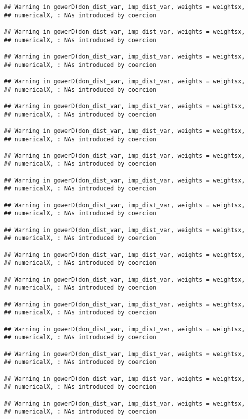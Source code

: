\documentclass[]{article}
\begin{document}
\begin{verbatim}
## Warning in gowerD(don_dist_var, imp_dist_var, weights = weightsx,
## numericalX, : NAs introduced by coercion

## Warning in gowerD(don_dist_var, imp_dist_var, weights = weightsx,
## numericalX, : NAs introduced by coercion

## Warning in gowerD(don_dist_var, imp_dist_var, weights = weightsx,
## numericalX, : NAs introduced by coercion

## Warning in gowerD(don_dist_var, imp_dist_var, weights = weightsx,
## numericalX, : NAs introduced by coercion

## Warning in gowerD(don_dist_var, imp_dist_var, weights = weightsx,
## numericalX, : NAs introduced by coercion

## Warning in gowerD(don_dist_var, imp_dist_var, weights = weightsx,
## numericalX, : NAs introduced by coercion

## Warning in gowerD(don_dist_var, imp_dist_var, weights = weightsx,
## numericalX, : NAs introduced by coercion

## Warning in gowerD(don_dist_var, imp_dist_var, weights = weightsx,
## numericalX, : NAs introduced by coercion

## Warning in gowerD(don_dist_var, imp_dist_var, weights = weightsx,
## numericalX, : NAs introduced by coercion

## Warning in gowerD(don_dist_var, imp_dist_var, weights = weightsx,
## numericalX, : NAs introduced by coercion

## Warning in gowerD(don_dist_var, imp_dist_var, weights = weightsx,
## numericalX, : NAs introduced by coercion

## Warning in gowerD(don_dist_var, imp_dist_var, weights = weightsx,
## numericalX, : NAs introduced by coercion

## Warning in gowerD(don_dist_var, imp_dist_var, weights = weightsx,
## numericalX, : NAs introduced by coercion

## Warning in gowerD(don_dist_var, imp_dist_var, weights = weightsx,
## numericalX, : NAs introduced by coercion

## Warning in gowerD(don_dist_var, imp_dist_var, weights = weightsx,
## numericalX, : NAs introduced by coercion

## Warning in gowerD(don_dist_var, imp_dist_var, weights = weightsx,
## numericalX, : NAs introduced by coercion

## Warning in gowerD(don_dist_var, imp_dist_var, weights = weightsx,
## numericalX, : NAs introduced by coercion


\end{verbatim}
\end{document}
